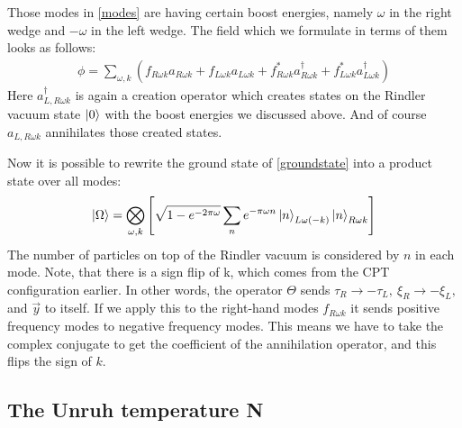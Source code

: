 	Those modes in \eqref{modes} are having certain boost energies, namely $\omega$ in the right wedge and $-\omega$ in the left wedge. The field which we formulate in terms of them looks as follows:
	\begin{align}
		\phi = \sum_{\omega, k} 
		\left(
			f_{R\omega k} a_{R\omega k} + f_{L\omega k}a_{L\omega k} + f^*_{R\omega k} a^\dagger_{R\omega k} + f^*_{L\omega k} a^\dagger_{L\omega k}
		\right)
	\end{align}
	Here $a^\dagger_{L,R\omega k}$ is again a creation operator which creates states on the Rindler vacuum state $\ket{0}$ with the boost energies we discussed above. And of course $a_{L,R\omega k}$ annihilates those created states. 
	
	Now it is possible to rewrite the ground state of \eqref{groundstate} into a product state over all modes:
	\begin{align}
		\ket{\Omega} = \bigotimes_{\omega, k} 
		\left[
			\sqrt{1-e^{-2\pi \omega}} \sum_n e^{-\pi \omega n} \ket{n}_{L \omega (-k)} \ket{n}_{R \omega k}
		\right]
	\end{align}
	The number of particles on top of the Rindler vacuum is considered by $n$ in each mode. Note, that there is a sign flip of k, which comes from the CPT configuration earlier. In other words, the operator $\Theta$ sends $\tau_R \rightarrow -\tau_L,~ \xi_R \rightarrow -\xi_L,$ and $\vec{y}$ to itself. If we apply this to the right-hand modes $f_{R\omega k}$ it sends positive frequency modes to negative frequency modes. This means we have to take the complex conjugate to get the coefficient of the annihilation operator, and this flips the sign of $k$.
\subsection{The Unruh temperature N} \label{Unruh}